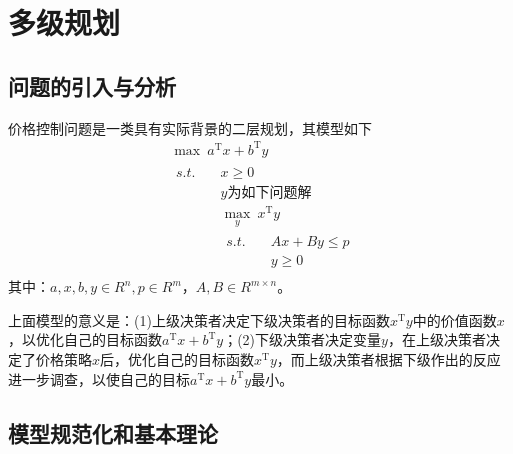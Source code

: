 
\chapter{多级规划}
\section{问题的引入与分析}
    \par
    价格控制问题是一类具有实际背景的二层规划，其模型如下
    \begin{align*}
        &{\max}\   a^\mathrm{T} x+b^\mathrm{T} y\\
        &
        \begin{aligned}
        s.t.\quad &x \geqslant 0\\
        & y\text{为如下问题解}\\
        & \mathop{\max}\limits_{y}\  x^\mathrm{T} y\\
        &
        \begin{aligned}
         s.t.\quad& Ax+By \leqslant p\\
        & y \geqslant 0
        \end{aligned}
        \end{aligned}
    \end{align*}
    其中：$a,x,b,y \in R^n,p \in R^m$，$A,B\in R^{m\times n}$。
    \par
    上面模型的意义是：(1)上级决策者决定下级决策者的目标函数$x^\mathrm{T} y$中的价值函数$x$，以优化自己的目标函数$a^\mathrm{T} x+b^\mathrm{T} y$；(2)下级决策者决定变量$y$，在上级决策者决定了价格策略$x$后，优化自己的目标函数$x^\mathrm{T} y$，而上级决策者根据下级作出的反应进一步调查，以使自己的目标$a^\mathrm{T} x+b^\mathrm{T} y$最小。
\section{模型规范化和基本理论}
